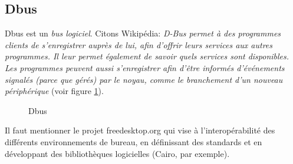 \subsection*{Dbus}
Dbus est un \emph{bus logiciel}. Citons Wikipédia: \og \emph{D-Bus permet à
des programmes clients de s'enregistrer auprès de lui, afin d'offrir
leurs services aux autres programmes. Il leur permet également de
savoir quels services sont disponibles. Les programmes peuvent aussi
s'enregistrer afin d'être informés d'événements signalés (parce que
gérés) par le noyau, comme le branchement d'un nouveau
périphérique}\fg{}
(voir figure \ref{dbus}).

\begin{figure}
  \begin{center}
  \end{center}
  \caption{Dbus}
  \label{dbus}
\end{figure}

Il faut mentionner le projet \textsf{freedesktop.org}\cite{fd} qui
vise à l'interopérabilité des différents environnements de bureau, en
définissant des standards et en développant des bibliothèques
logicielles  (Cairo, par exemple).
